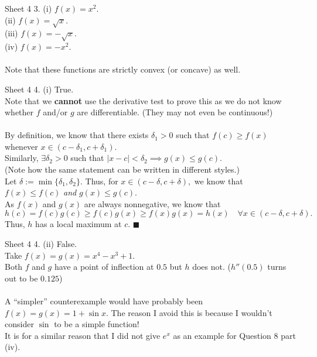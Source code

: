 \documentclass[handout, aspectratio=169]{beamer}
\begin{document}
\begin{frame}{Sheet 4}
	3. (i) $f(x) = x^2.$ \\
	 (ii) $f(x) = \sqrt{x}.$ \\
	 (iii) $f(x) = -\sqrt{x}.$ \\
	 (iv) $f(x) = -x^2.$ \\~\\
	 Note that these functions are strictly convex (or concave) as well.

\end{frame}
\begin{frame}{Sheet 4}
	4. (i) True.\\
	Note that we \textbf{cannot} use the derivative test to prove this as we do not know whether $f$ and/or $g$ are differentiable. (They may not even be continuous!)\\~\\
	By definition, we know that there exists $\delta_1 > 0$ such that $f(c) \ge f(x)$ whenever $x \in (c - \delta_1, c + \delta_1).$\\
	Similarly, $\exists \delta_2 > 0$ such that $|x - c| < \delta_2 \implies g(x) \le g(c).$\\
	(Note how the same statement can be written in different styles.)\\
	Let $\delta := \min\{\delta_1, \delta_2\}.$ Thus, for $x \in (c-\delta, c+\delta),$ we know that $f(x) \le f(c)$ \emph{and} $g(x) \le g(c).$\\
	As $f(x)$ and $g(x)$ are always nonnegative, we know that
	\[h(c) = f(c)g(c) \ge f(c)g(x) \ge f(x)g(x) = h(x) \quad \forall x \in (c-\delta, c+\delta).\]
	Thus, $h$ has a local maximum at $c.$ \hfill $\blacksquare$
\end{frame}
\begin{frame}{Sheet 4}
	4. (ii) False.\\
	Take $f(x) = g(x) = x^4 - x^3 + 1.$\\
	Both $f$ and $g$ have a point of inflection at $0.5$ but $h$ does not. ($h''(0.5)$ turns out to be $0.125$)\\~\\
	A ``simpler'' counterexample would have probably been $f(x) = g(x) = 1 + \sin x.$ The reason I avoid this is because I wouldn't consider $\sin$ to be a simple function!\\
	It is for a similar reason that I did not give $e^x$ as an example for Question 8 part (iv).
\end{frame}
\end{document}
